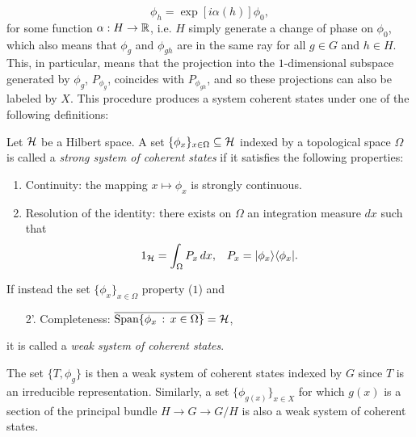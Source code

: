 \begin{equation*}
    \phi_h = \exp{[i \alpha(h)]}\phi_0,
\end{equation*}
for some function $\alpha : H \to \mathbb{R}$, i.e. $H$ simply generate a change of phase on $\phi_0$, which also means that $\phi_g$ and $\phi_{gh}$ are in the same ray for all $g \in G$ and $h \in H$. This, in particular, means that the projection into the $1$-dimensional subspace generated by $\phi_g$, $P_{\phi_g}$, coincides with $P_{\phi_{gh}}$, and so these projections can also be labeled by $X$. This procedure produces a system coherent states under one of the following definitions:

\begin{definition}\label{definitionSystemCoherentStates}
Let $\mathcal H$ be a Hilbert space. A set $\{\phi_x\}_{x \in \Omega} \subset \hcal$ indexed by a topological space $\Omega$ is called a \emph{strong system of coherent states} if it satisfies the following properties:
\begin{enumerate}
    \item Continuity: the mapping $x \mapsto \phi_x$ is strongly continuous.
    
    \item Resolution of the identity: there exists on $\Omega$ an integration measure $dx$ such that
    \begin{align}
        1_{\hcal} = \int_{\Omega} P_x \,dx, && P_x = |\phi_x \rangle \langle \phi_x |.
     \end{align}
\end{enumerate}
If instead the set $\{\phi_x\}_{x \in \Omega}$ property ($1$) and 
\begin{enumerate}
    \item[2'.] Completeness: $\overline{\text{Span}\{\phi_x \,:\, x \in \Omega\}} = \hcal$,
\end{enumerate}
it is called a \emph{weak system of coherent states}.
\end{definition}

The set $\{T, \phi_g\}$ is then a weak system of coherent states indexed by $G$ since $T$ is an irreducible representation. Similarly, a set $\{\phi_{g(x)}\}_{x \in X}$ for which $g(x)$ is a section of the principal bundle $H \to G \to G/H$ is also a weak system of coherent states.

\lin

